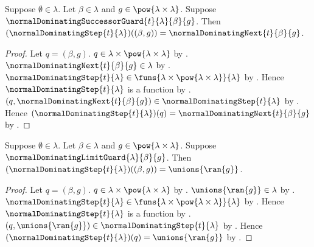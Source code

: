 \begin{proposition}\label{normal_dominating_step_successor}
    Suppose $\emptyset\in\lambda$.
    Let $\beta\in\lambda$ and
        $g\in\pow{\lambda\times\lambda}$.
    Suppose $\normalDominatingSuccessorGuard{t}{\lambda}{\beta}{g}$.
    Then $(\normalDominatingStep{t}{\lambda})((\beta,g))
        =\normalDominatingNext{t}{\beta}{g}$.
\end{proposition}
\begin{proof}
    Let $q=(\beta,g)$.
    $q\in\lambda\times\pow{\lambda\times\lambda}$ by
        .
    $\normalDominatingNext{t}{\beta}{g}\in\lambda$ by
        .
    $\normalDominatingStep{t}{\lambda}
        \in\funs{\lambda\times\pow{\lambda\times\lambda}}{\lambda}$ by
        .
    Hence $\normalDominatingStep{t}{\lambda}$ is a function by
        .
    $(q,\normalDominatingNext{t}{\beta}{g})
        \in\normalDominatingStep{t}{\lambda}$ by
        .
    Hence $(\normalDominatingStep{t}{\lambda})(q)
        =\normalDominatingNext{t}{\beta}{g}$ by
        .
\end{proof}

\begin{proposition}\label{normal_dominating_step_limit}
    Suppose $\emptyset\in\lambda$.
    Let $\beta\in\lambda$ and
        $g\in\pow{\lambda\times\lambda}$.
    Suppose $\normalDominatingLimitGuard{\lambda}{\beta}{g}$.
    Then $(\normalDominatingStep{t}{\lambda})((\beta,g))
        =\unions{\ran{g}}$.
\end{proposition}
\begin{proof}
    Let $q=(\beta,g)$.
    $q\in\lambda\times\pow{\lambda\times\lambda}$ by
        .
    $\unions{\ran{g}}\in\lambda$ by
        .
    $\normalDominatingStep{t}{\lambda}
        \in\funs{\lambda\times\pow{\lambda\times\lambda}}{\lambda}$ by
        .
    Hence $\normalDominatingStep{t}{\lambda}$ is a function by
        .
    $(q,\unions{\ran{g}})\in\normalDominatingStep{t}{\lambda}$ by
        .
    Hence $(\normalDominatingStep{t}{\lambda})(q)
        =\unions{\ran{g}}$ by .
\end{proof}

